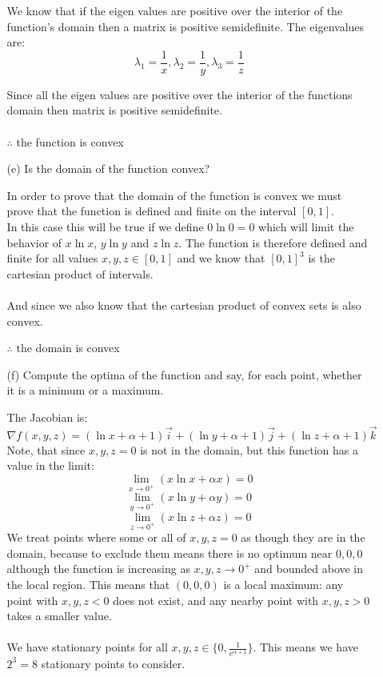 \begin{enumerate}
\begin{enumerate}
			\textnormal{We know that if the eigen values are positive over the interior of the function's domain then a matrix is positive semidefinite. The eigenvalues are:}
			\[
				\lambda_1 = \frac{1}{x}, \lambda_2 = \frac{1}{y}, \lambda_3 = \frac{1}{z}
			\] 
			
			\textnormal{Since all the eigen values are positive over the interior of the functions domain  then matrix is positive semidefinite.}\\ \\
			\(\therefore \) \textnormal{the function is convex} \\
			
			\item[(e)] Is the domain of the function convex? 
			
			\textnormal{In order to prove that the domain of the function is convex we must prove that the function is defined and finite on the interval \([0,1]\).} \\
			
			\textnormal{In this case this will be true if we define \(0 \ln 0 = 0\) which will limit the behavior of \(x \ln x\), \(y \ln y\) and \(z \ln z\). The function is therefore defined and finite for all values \( x,y,z \in [0,1] \) and we know that \( [0,1]^3 \) is the cartesian product of intervals. } \\ \\
			
			\textnormal{And since we also know that the cartesian product of convex sets is also convex.}
			
			\( \therefore \) \textnormal{ the domain is convex} \\
			
			\item[(f)] Compute the optima of the function and say, for each point, whether it is a minimum or a maximum.
			
			\textnormal{The Jacobian is:}
			\[
				\nabla f(x,y,z) = (\ln x + \alpha + 1)\vec{i} + (\ln y + \alpha + 1)\vec{j} + (\ln z + \alpha + 1)\vec{k}
			\]
			\textnormal{Note, that since \(x,y,z = 0\) is not in the domain, but this function has a value in the limit:}
			\[
				\lim_{x \rightarrow 0^+ }(x \ln x + \alpha x) = 0
			\]
			\[
				\lim_{y \rightarrow 0^+ }(x \ln y + \alpha y) = 0
			\]
			\[
				\lim_{z \rightarrow 0^+ }(x \ln z + \alpha z) = 0
			\]
			\textnormal{We treat points where some or all of \(x,y,z = 0 \) as though they are in the domain, because to exclude them means there is no optimum near \(0,0,0\) although the function is increasing as \(x,y,z \rightarrow 0^+ \) and bounded above in the local region. This means that \((0,0,0)\) is a local maximum: any point with \(x,y,z < 0\) does not exist, and any nearby point with \(x,y,z > 0\) takes a smaller value.} \\ \\
			\textnormal{We have stationary points for all \( x,y,z \in \{ 0, \frac{1}{e^{\alpha + 1}} \} \).  This means we have \(2^3 = 8\) stationary points to consider.} \\ 
			

\end{enumerate}
\end{enumerate}
